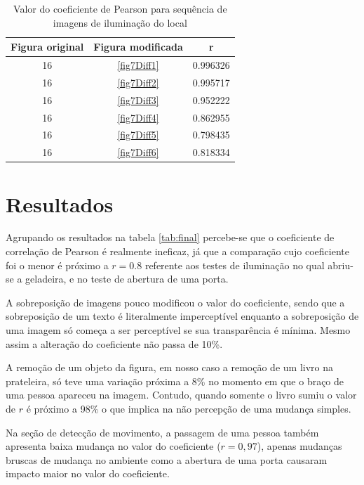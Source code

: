 \documentclass[10pt,a4paper]{article}
\begin{document}
\begin{table}[h!]
  \begin{center}
    \caption{Valor do coeficiente de Pearson para sequência de imagens
      de iluminação do local}
    \begin{tabular}{|c|c|c|}
      \hline
      Figura original & Figura modificada & r\\
      \hline
      16 &  \ref{fig7Diff1} & 0.996326\\
      16 &  \ref{fig7Diff2} & 0.995717\\
      16 &  \ref{fig7Diff3} & 0.952222\\
      16 &  \ref{fig7Diff4} & 0.862955\\
      16 &  \ref{fig7Diff5} & 0.798435\\
      16 &  \ref{fig7Diff6} &  0.818334\\
      \hline
    \end{tabular}
  \end{center}
\end{table}
\newpage
\section{Resultados}
Agrupando os resultados na tabela \ref{tab:final} percebe-se que o
coeficiente de correlação de Pearson é realmente ineficaz, já que a
comparação cujo coeficiente foi o menor é próximo a $r=0.8$ referente
aos testes de iluminação no qual abriu-se a geladeira, e no teste de
abertura de uma porta.

A sobreposição de imagens pouco modificou o valor do coeficiente,
sendo que a sobreposição de um texto é literalmente imperceptível
enquanto a sobreposição de uma imagem só começa a ser perceptível se
sua transparência é mínima. Mesmo assim a alteração do coeficiente não
passa de 10\%.

A remoção de um objeto da figura, em nosso caso a remoção de um livro
na prateleira, só teve uma variação próxima a 8\% no momento em que o
braço de uma pessoa apareceu na imagem. Contudo, quando somente o
livro sumiu o valor de $r$ é próximo a 98\% o que implica na não
percepção de uma mudança simples.

Na seção de detecção de movimento, a passagem de uma pessoa também
apresenta baixa mudança no valor do coeficiente ($r=0,97$), apenas
mudanças bruscas de mudança no ambiente como a abertura de uma porta
causaram impacto maior no valor do coeficiente.
\end{document}
